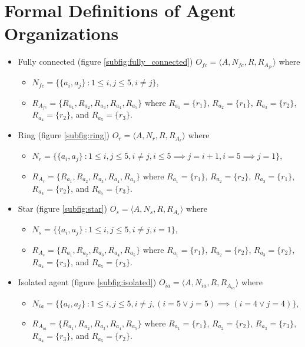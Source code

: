 \documentclass{llncs}
\begin{document}
\section{Formal Definitions of Agent Organizations}
\begin{itemize}
 \item Fully connected (figure \ref{subfig:fully_connected}) $O_{fc}=\langle A, N_{fc}, R, R_{A_{fc}}  \rangle$ where
    \begin{itemize}
    \item $N_{fc}=\{\{a_i,a_j \}\ : 1 \le i,j \le 5, i\neq j \}$,
    \item $R_{A_{fc}}=\{R_{a_1}, R_{a_2}, R_{a_3}, R_{a_4}, R_{a_5}\}$ where $R_{a_1}=\{r_1\}$, $R_{a_2}=\{r_1\}$, $R_{a_3}=\{r_2\}$, $R_{a_4}=\{r_2\}$, and $R_{a_5}=\{r_3\}$.
    \end{itemize}
 \item Ring (figure \ref{subfig:ring}) $O_r=\langle A, N_r, R, R_{A_r}  \rangle$ where
    \begin{itemize}
    \item $N_r=\{\{a_i,a_j \}\ : 1 \le i,j \le 5, i\neq j, i\le 5 \implies j=i+1, i=5 \implies j=1 \}$,
    \item $R_{A_r}=\{R_{a_1}, R_{a_2}, R_{a_3}, R_{a_4}, R_{a_5}\}$ where $R_{a_1}=\{r_1\}$, $R_{a_2}=\{r_2\}$, $R_{a_3}=\{r_1\}$, $R_{a_4}=\{r_2\}$, and $R_{a_5}=\{r_3\}$.
    \end{itemize}
 \item Star (figure \ref{subfig:star}) $O_s=\langle A, N_s, R, R_{A_s}  \rangle$ where
    \begin{itemize}
    \item $N_s=\{\{a_i,a_j \}\ : 1 \le i,j \le 5, i\neq j, i=1 \}$,
    \item $R_{A_s}=\{R_{a_1}, R_{a_2}, R_{a_3}, R_{a_4}, R_{a_5}\}$ where $R_{a_1}=\{r_1\}$, $R_{a_2}=\{r_2\}$, $R_{a_3}=\{r_2\}$, $R_{a_4}=\{r_3\}$, and $R_{a_5}=\{r_3\}$.
    \end{itemize}
 \item Isolated agent (figure \ref{subfig:isolated}) $O_{ia}=\langle A, N_{ia}, R, R_{A_{ia}}  \rangle$ where
    \begin{itemize}
    \item $N_{ia}=\{\{a_i,a_j \}\ : 1 \le i,j \le 5, i\neq j, (i=5 \vee j=5) \implies (i=4 \vee j=4) \}$,
    \item $R_{A_{ia}}=\{R_{a_1}, R_{a_2}, R_{a_3}, R_{a_4}, R_{a_5}\}$ where $R_{a_1}=\{r_1\}$, $R_{a_2}=\{r_2\}$, $R_{a_3}=\{r_3\}$, $R_{a_4}=\{r_3\}$, and $R_{a_5}=\{r_2\}$.
    \end{itemize}
\end{itemize}
\end{document}
